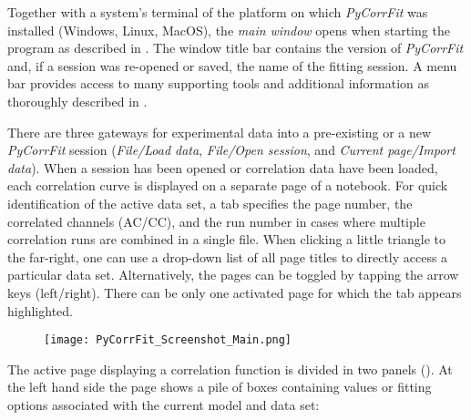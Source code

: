 Together with a system's terminal of the platform on which \textit{PyCorrFit} was installed (Windows, Linux, MacOS), the \textit{main window} opens when starting the program as described in . The window title bar contains the version of \textit{PyCorrFit} and, if a session was re-opened or saved, the name of the fitting session. A menu bar provides access to many supporting tools and additional information as thoroughly described in . 

There are three gateways for experimental data into a pre-existing or a new \textit{PyCorrFit} session (\textit{File/Load data}, \textit{File/Open session}, and \textit{Current page/Import data}). When a session has been opened or correlation data have been loaded, each correlation curve is displayed on a separate page of a notebook. For quick identification of the active data set, a tab specifies the page number, the correlated channels (AC/CC), and the run number in cases where  multiple correlation runs are combined in a single file. When clicking a little triangle to the far-right, one can use a drop-down list of all page titles to directly access a particular data set. Alternatively, the pages can be toggled by tapping the arrow keys (left/right). There can be only one activated page for which the tab appears highlighted.

\begin{figure}[h]
\centering
\texttt{[image: PyCorrFit\_Screenshot\_Main.png]}
\end{figure}

The active page displaying a correlation function is divided in two panels (). At the left hand side the page shows a pile of boxes containing values or fitting options associated with the current model and data set: 

